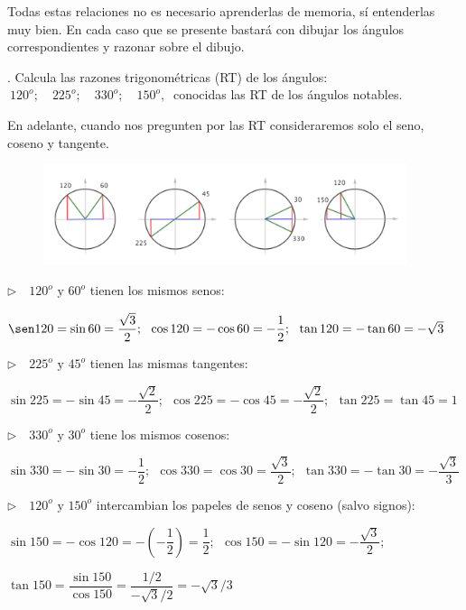 Todas estas relaciones no es necesario aprenderlas de memoria, sí entenderlas muy bien. En cada caso que se presente bastará con dibujar los ángulos correspondientes y razonar sobre el dibujo.
\vspace{5mm}
\begin{miejemplo}
	. Calcula las razones trigonométricas (RT) de los ángulos: 
	$\ 120^o;\quad 225^o;\quad 330^o; \quad 150^o,\ $ conocidas las RT de los ángulos notables.
	
\begin{footnotesize} \vspace{2mm}\textcolor{gris}{En adelante, cuando nos pregunten por las RT consideraremos solo el seno, coseno y tangente.} \end{footnotesize}
	
\begin{figure}[H]
	\centering
	\includegraphics[width=0.95\textwidth]{img-rt/rt15.png}
\end{figure}

$\triangleright \quad  120^o \text{ y } 60^o$ tienen los mismos senos: 

$\sen 120=\sin 60=\dfrac{\sqrt{3}}{2};\ \ \cos 120=-\cos 60=-\dfrac 1 2; \ \ \tan 120= -\tan 60=-\sqrt{3}$

\vspace{4mm} $\triangleright \quad 225^o \text{ y } 45^o$ tienen las mismas tangentes:

$\sin 225=-\sin 45=-\dfrac{\sqrt{2}}{2};\ \ \cos 225=-\cos 45=-\dfrac{\sqrt{2}}{2};\ \ \tan 225=\tan 45=1$

\vspace{4mm} $\triangleright \quad 330^o \text{ y } 30^o$ tiene los mismos cosenos:

$\sin 330=-\sin 30=-\dfrac 1 2 ;\ \  \cos 330=\cos 30=\dfrac{\sqrt{3}}{2};\ \ \tan 330=-\tan 30 =-\dfrac{\sqrt{3}}{3}$

\vspace{4mm} $\triangleright \quad 120^o \text{ y }150^o$ intercambian los papeles de senos y coseno (salvo signos):

$\sin 150=-\cos 120=-(-\dfrac 1 2)=\dfrac 1 2;\ \ \cos 150=-\sin 120=-\dfrac{\sqrt{3}}{2};\ \ $

$\tan 150 = \dfrac{\sin 150}{\cos 150}=\dfrac{1/2}{-\sqrt{3}/2}= -\sqrt{3}/3$

\end{miejemplo}

